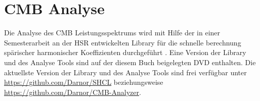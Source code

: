 \section{CMB Analyse}

Die Analyse des CMB Leistungsspektrums wird mit Hilfe der in einer 
Semesterarbeit an der HSR entwickelten Library für die schnelle berechnung 
spärischer harmonischer Koeffizienten durchgeführt \cite{cmb:SA_Patzen}. Eine 
Version der Library und des Analyse Tools sind auf der diesem Buch beigelegten 
DVD enthalten. Die aktuellste Version der Library und des Analyse Tools sind 
frei verfügbar unter \url{https://github.com/Darnor/SHCL} beziehungsweise 
\url{https://github.com/Darnor/CMB-Analyzer}.






